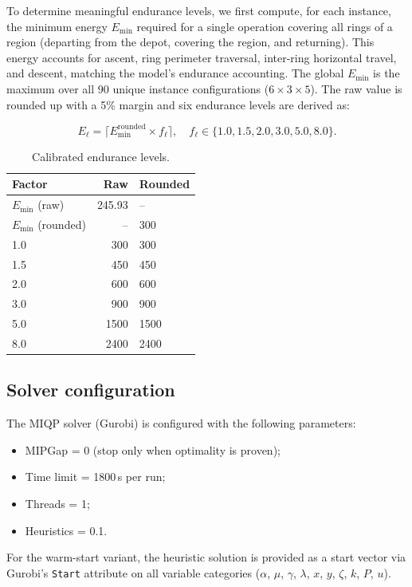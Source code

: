 \documentclass[12pt]{elsarticle}
\begin{document}
To determine meaningful endurance levels, we first compute, for each instance, the minimum energy $E_{\min}$ required for a single operation covering all rings of a region (departing from the depot, covering the region, and returning). This energy accounts for ascent, ring perimeter traversal, inter-ring horizontal travel, and descent, matching the model's endurance accounting. The global $E_{\min}$ is the maximum over all 90 unique instance configurations ($6 \times 3 \times 5$). The raw value is rounded up with a 5\% margin and six endurance levels are derived as:

\[
E_\ell = \bigl\lceil E_{\min}^{\text{rounded}} \times f_\ell \bigr\rceil, \quad f_\ell \in \{1.0, 1.5, 2.0, 3.0, 5.0, 8.0\}.
\]

\begin{table}[h!]
\centering
\caption{Calibrated endurance levels.}
\label{tab:endurance-levels}
\begin{tabular}{lrl}
\toprule
Factor & Raw & Rounded \\
\midrule
$E_{\min}$ (raw) & 245.93 & -- \\
$E_{\min}$ (rounded) & -- & 300 \\
1.0 & 300 & 300 \\
1.5 & 450 & 450 \\
2.0 & 600 & 600 \\
3.0 & 900 & 900 \\
5.0 & 1500 & 1500 \\
8.0 & 2400 & 2400 \\
\bottomrule
\end{tabular}
\end{table}

\subsection{Solver configuration}
\label{sec:solver-config}

The MIQP solver (Gurobi) is configured with the following parameters:
\begin{itemize}
    \item MIPGap = 0 (stop only when optimality is proven);
    \item Time limit = 1800\,s per run;
    \item Threads = 1;
    \item Heuristics = 0.1.
\end{itemize}
For the warm-start variant, the heuristic solution is provided as a start vector via Gurobi's \texttt{Start} attribute on all variable categories ($\alpha$, $\mu$, $\gamma$, $\lambda$, $x$, $y$, $\zeta$, $k$, $P$, $u$).
\end{document}
